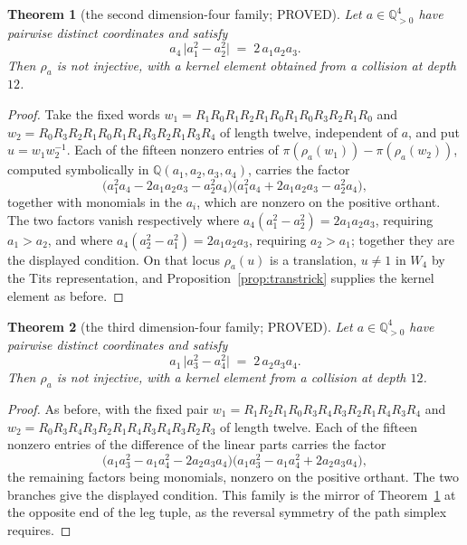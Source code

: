 \documentclass[11pt]{article}
\newtheorem{theorem}{Theorem}[section]
\theoremstyle{definition}
\theoremstyle{remark}
\theoremstyle{definition}
\newcommand{\Q}{\mathbb{Q}}
\begin{document}
\begin{theorem}[the second dimension-four family; PROVED]\label{thm:family4b}
Let $a\in\Q_{>0}^4$ have pairwise distinct coordinates and satisfy
\[
   a_4\,\bigl|a_1^2-a_2^2\bigr| \;=\; 2\,a_1a_2a_3 .
\]
Then $\rho_a$ is not injective, with a kernel element obtained from a collision at depth $12$.
\end{theorem}

\begin{proof}
Take the fixed words $w_1=R_1R_0R_1R_2R_1R_0R_1R_0R_3R_2R_1R_0$ and
$w_2=R_0R_3R_2R_1R_0R_1R_4R_3R_2R_1R_3R_4$ of length twelve, independent of $a$, and put
$u=w_1w_2^{-1}$. Each of the fifteen nonzero entries of
$\pi(\rho_a(w_1))-\pi(\rho_a(w_2))$, computed symbolically in $\Q(a_1,a_2,a_3,a_4)$, carries the
factor
\[
   \bigl(a_1^2a_4-2a_1a_2a_3-a_2^2a_4\bigr)\bigl(a_1^2a_4+2a_1a_2a_3-a_2^2a_4\bigr),
\]
together with monomials in the $a_i$, which are nonzero on the positive orthant. The two factors
vanish respectively where $a_4(a_1^2-a_2^2)=2a_1a_2a_3$, requiring $a_1>a_2$, and where
$a_4(a_2^2-a_1^2)=2a_1a_2a_3$, requiring $a_2>a_1$; together they are the displayed condition.
On that locus $\rho_a(u)$ is a translation, $u\ne1$ in $W_4$ by the Tits representation, and
Proposition~\ref{prop:transtrick} supplies the kernel element as before.
\end{proof}

\begin{theorem}[the third dimension-four family; PROVED]\label{thm:family4c}
Let $a\in\Q_{>0}^4$ have pairwise distinct coordinates and satisfy
\[
   a_1\,\bigl|a_3^2-a_4^2\bigr| \;=\; 2\,a_2a_3a_4 .
\]
Then $\rho_a$ is not injective, with a kernel element from a collision at depth $12$.
\end{theorem}

\begin{proof}
As before, with the fixed pair $w_1=R_1R_2R_1R_0R_3R_4R_3R_2R_1R_4R_3R_4$ and
$w_2=R_0R_3R_4R_3R_2R_1R_4R_3R_4R_3R_2R_3$ of length twelve. Each of the fifteen nonzero entries
of the difference of the linear parts carries the factor
\[
   \bigl(a_1a_3^2-a_1a_4^2-2a_2a_3a_4\bigr)\bigl(a_1a_3^2-a_1a_4^2+2a_2a_3a_4\bigr),
\]
the remaining factors being monomials, nonzero on the positive orthant. The two branches give the
displayed condition. This family is the mirror of Theorem~\ref{thm:family4b} at the opposite end
of the leg tuple, as the reversal symmetry of the path simplex requires.
\end{proof}
\end{document}
